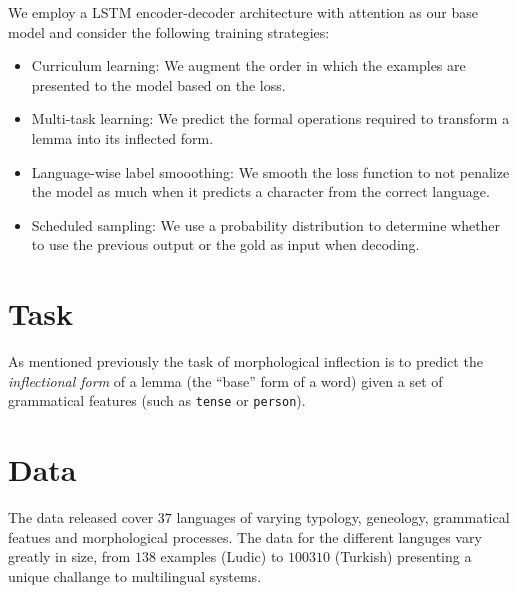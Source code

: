 \documentclass[11pt,a4paper]{article}
\begin{document}


We employ a LSTM encoder-decoder architecture with attention as our
base model and consider the following training strategies:

\begin{itemize}
\item Curriculum learning: We augment the order in which the examples are presented to the model based on the loss.
\item Multi-task learning: We predict the formal operations required to transform a lemma into its inflected form.
\item Language-wise label smooothing: We smooth the loss function to not penalize the model as much when it predicts a character from the correct language.
\item Scheduled sampling: We use a probability distribution to determine whether to use the previous output or the gold as input when decoding.
\end{itemize}

\section{Task}

As mentioned previously the task of morphological inflection is to
predict the \emph{inflectional form} of a lemma (the ``base'' form of
a word) given a set of grammatical features (such as \texttt{tense} or
\texttt{person}).
%


\section{Data}

The data released cover $37$ languages of varying typology, geneology,
grammatical featues and morphological processes. The data for the
different languges vary greatly in size, from $138$ examples (Ludic) to
$100310$ (Turkish) presenting a unique challange to multilingual
systems.
\end{document}
